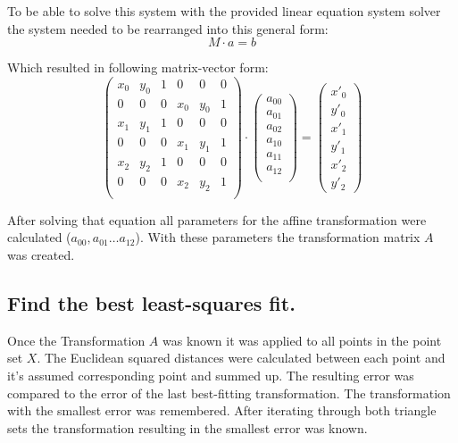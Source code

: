 To be able to solve this system with the provided linear equation system solver the system needed to be rearranged into this general form:
\begin{equation}
	M \cdot a = b
\end{equation}

Which resulted in following matrix-vector form:
\begin{equation}
	\begin{pmatrix}
		x_0 & y_0 & 1 & 0 & 0 & 0 \\
		0 & 0 & 0 & x_0 & y_0 & 1 \\
		x_1 & y_1 & 1 & 0 & 0 & 0 \\
		0 & 0 & 0 & x_1 & y_1 & 1 \\
		x_2 & y_2 & 1 & 0 & 0 & 0 \\
		0 & 0 & 0 & x_2 & y_2 & 1 \\
	\end{pmatrix} 
	\cdot
	\begin{pmatrix}
		a_{00} \\
		a_{01} \\
		a_{02} \\
		a_{10} \\
		a_{11} \\
		a_{12} \\
	\end{pmatrix}
	=
	\begin{pmatrix}
		x'_0 \\
		y'_0 \\
		x'_1 \\
		y'_1 \\
		x'_2 \\
		y'_2
	\end{pmatrix}
\end{equation}

After solving that equation all parameters for the affine transformation were calculated ($a_{00}, a_{01} \ldots a_{12}$). With these parameters the transformation matrix $A$ was created.

\subsection{Find the best least-squares fit.}
Once the Transformation $A$ was known it was applied to all points in the point set $X$. The Euclidean squared distances were calculated between each point and it's assumed corresponding point and summed up. The resulting error was compared to the error of the last best-fitting transformation. The transformation with the smallest error was remembered. After iterating through both triangle sets the transformation resulting in the smallest error was known.

